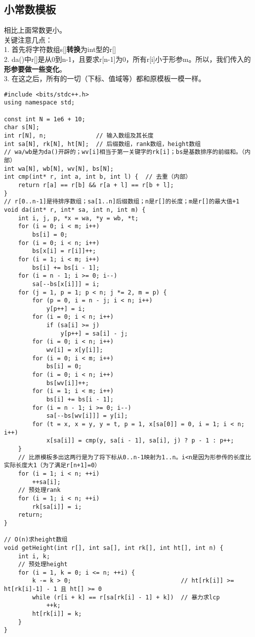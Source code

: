     \subsection{小常数模板}
        相比上面常数更小。\\
        关键注意几点：\\
        1. 首先将字符数组s[]\textbf{转换}为int型的r[]\\
        2. da()中r[]是从0到n-1，且要求r[n-1]为0，所有r[i]小于形参m。所以，我们传入的\textbf{形参要做一些变化}。\\
        3. 在这之后，所有的一切（下标、值域等）都和原模板一模一样。
\begin{lstlisting}
#include <bits/stdc++.h>
using namespace std;

const int N = 1e6 + 10;
char s[N];
int r[N], n;              // 输入数组及其长度
int sa[N], rk[N], ht[N];  // 后缀数组，rank数组，height数组
// wa/wb是为da()开辟的；wv[i]相当于第一关键字的rk[i]；bs是基数排序的前缀和。（内部）
int wa[N], wb[N], wv[N], bs[N];
int cmp(int* r, int a, int b, int l) {  // 去重（内部）
    return r[a] == r[b] && r[a + l] == r[b + l];
}
// r[0..n-1]是待排序数组；sa[1..n]后缀数组；n是r[]的长度；m是r[]的最大值+1
void da(int* r, int* sa, int n, int m) {
    int i, j, p, *x = wa, *y = wb, *t;
    for (i = 0; i < m; i++)
        bs[i] = 0;
    for (i = 0; i < n; i++)
        bs[x[i] = r[i]]++;
    for (i = 1; i < m; i++)
        bs[i] += bs[i - 1];
    for (i = n - 1; i >= 0; i--)
        sa[--bs[x[i]]] = i;
    for (j = 1, p = 1; p < n; j *= 2, m = p) {
        for (p = 0, i = n - j; i < n; i++)
            y[p++] = i;
        for (i = 0; i < n; i++)
            if (sa[i] >= j)
                y[p++] = sa[i] - j;
        for (i = 0; i < n; i++)
            wv[i] = x[y[i]];
        for (i = 0; i < m; i++)
            bs[i] = 0;
        for (i = 0; i < n; i++)
            bs[wv[i]]++;
        for (i = 1; i < m; i++)
            bs[i] += bs[i - 1];
        for (i = n - 1; i >= 0; i--)
            sa[--bs[wv[i]]] = y[i];
        for (t = x, x = y, y = t, p = 1, x[sa[0]] = 0, i = 1; i < n; i++)
            x[sa[i]] = cmp(y, sa[i - 1], sa[i], j) ? p - 1 : p++;
    }
    // 比原模板多出这两行是为了将下标从0..n-1映射为1..n。i<n是因为形参传的长度比实际长度大1（为了满足r[n+1]=0）
    for (i = 1; i < n; ++i)
        ++sa[i];
    // 预处理rank
    for (i = 1; i < n; ++i)
        rk[sa[i]] = i;
    return;
}

// O(n)求height数组
void getHeight(int r[], int sa[], int rk[], int ht[], int n) {
    int i, k;
    // 预处理height
    for (i = 1, k = 0; i <= n; ++i) {
        k -= k > 0;                               // ht[rk[i]] >= ht[rk[i]-1] - 1 且 ht[] >= 0
        while (r[i + k] == r[sa[rk[i] - 1] + k])  // 暴力求lcp
            ++k;
        ht[rk[i]] = k;
    }
}


\end{lstlisting}
